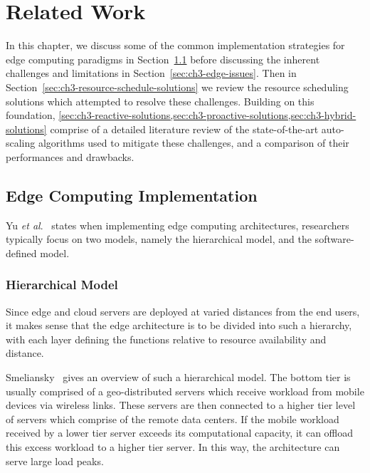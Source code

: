 \clearpage

\def\chaptertitle{Related Work}

\lhead{\emph{\chaptertitle}}

\chapter{\chaptertitle}
\label{ch:lit-review}

In this chapter, we discuss some of the common implementation strategies for edge computing paradigms in Section~\ref{sec:ch3-edge-implementation} before discussing the inherent challenges and limitations in Section~\ref{sec:ch3-edge-issues}. Then in Section~\ref{sec:ch3-resource-schedule-solutions} we review the resource scheduling solutions which attempted to resolve these challenges. Building on this foundation, \cref{sec:ch3-reactive-solutions,sec:ch3-proactive-solutions,sec:ch3-hybrid-solutions} comprise of a detailed literature review of the state-of-the-art auto-scaling algorithms used to mitigate these challenges, and a comparison of their performances and drawbacks.

\section{Edge Computing Implementation}
\label{sec:ch3-edge-implementation}

Yu \textit{et al}.~\cite{yu2017survey} states when implementing edge computing architectures, researchers typically focus on two models, namely the hierarchical model, and the software-defined model.\par

\subsection{Hierarchical Model}
\label{subsec:ch3-hierarchical-model}

Since edge and cloud servers are deployed at varied distances from the end users, it makes sense that the edge architecture is to be divided into such a hierarchy, with each layer defining the functions relative to resource availability and distance.\par

Smeliansky~\cite{smeliansky2018hierarchical} gives an overview of such a hierarchical model. The bottom tier is usually comprised of a geo-distributed servers which receive workload from mobile devices via wireless links. These servers are then connected to a higher tier level of servers which comprise of the remote data centers. If the mobile workload received by a lower tier server exceeds its computational capacity, it can offload this excess workload to a higher tier server. In this way, the architecture can serve large load peaks.\par

